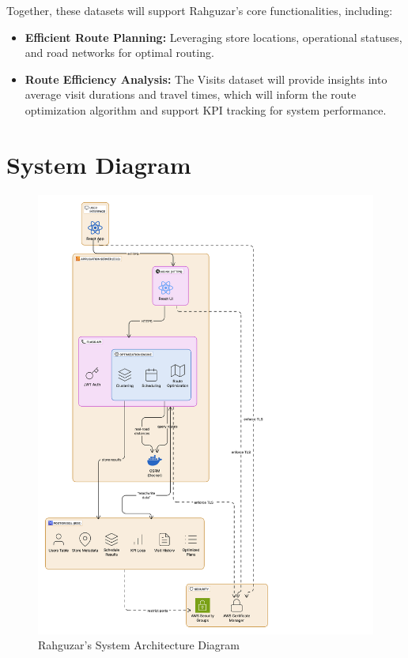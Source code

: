 Together, these datasets will support Rahguzar’s core functionalities, including:
\begin{itemize}
    \item \textbf{Efficient Route Planning:} Leveraging store locations, operational statuses, and road networks for optimal routing.
    \item \textbf{Route Efficiency Analysis:} The Visits dataset will provide insights into average visit durations and travel times, which will inform the route optimization algorithm and support KPI tracking for system performance.
\end{itemize}


\section{System Diagram}
\begin{center}
        \begin{figure}[H]
        \centering
        \includegraphics[width=\textwidth, height=0.75\textheight]{images/diagram.png} 
        \caption{Rahguzar's System Architecture Diagram}
    \end{figure}
\end{center}